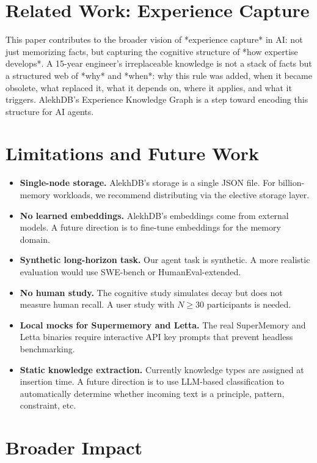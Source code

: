 \section{Related Work: Experience Capture}

This paper contributes to the broader vision of *experience capture* in AI: not just memorizing facts, but capturing the cognitive structure of *how expertise develops*. A 15-year engineer's irreplaceable knowledge is not a stack of facts but a structured web of *why* and *when*: why this rule was added, when it became obsolete, what replaced it, what it depends on, where it applies, and what it triggers. AlekhDB's Experience Knowledge Graph is a step toward encoding this structure for AI agents.

\section{Limitations and Future Work}

\begin{itemize}
\item \textbf{Single-node storage.} AlekhDB's storage is a single JSON file. For billion-memory workloads, we recommend distributing via the elective storage layer.
\item \textbf{No learned embeddings.} AlekhDB's embeddings come from external models. A future direction is to fine-tune embeddings for the memory domain.
\item \textbf{Synthetic long-horizon task.} Our agent task is synthetic. A more realistic evaluation would use SWE-bench or HumanEval-extended.
\item \textbf{No human study.} The cognitive study simulates decay but does not measure human recall. A user study with $N \geq 30$ participants is needed.
\item \textbf{Local mocks for Supermemory and Letta.} The real SuperMemory and Letta binaries require interactive API key prompts that prevent headless benchmarking.
\item \textbf{Static knowledge extraction.} Currently knowledge types are assigned at insertion time. A future direction is to use LLM-based classification to automatically determine whether incoming text is a principle, pattern, constraint, etc.
\end{itemize}

\section{Broader Impact}

